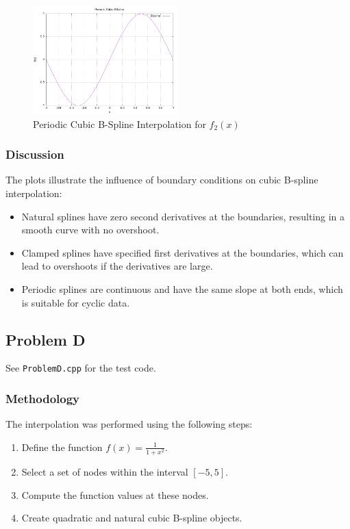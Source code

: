 \documentclass{article}
\begin{document}
\begin{figure}[H]
    \centering
    \includegraphics[width=0.5\textwidth]{../figure/PCBspline_plot.png}
    \caption{Periodic Cubic B-Spline Interpolation for \( f_2(x) \)}
    \label{fig:periodic}
\end{figure}

\subsubsection{Discussion}
The plots illustrate the influence of boundary conditions on cubic B-spline interpolation:
\begin{itemize}
    \item Natural splines have zero second derivatives at the boundaries, resulting in a smooth curve with no overshoot.
    \item Clamped splines have specified first derivatives at the boundaries, which can lead to overshoots if the derivatives are large.
    \item Periodic splines are continuous and have the same slope at both ends, which is suitable for cyclic data.
\end{itemize}


\subsection{Problem D}
See \texttt{ProblemD.cpp} for the test code.
\subsubsection{Methodology}
The interpolation was performed using the following steps:
\begin{enumerate}
    \item Define the function \( f(x) = \frac{1}{1 + x^2} \).
    \item Select a set of nodes within the interval \([-5, 5]\).
    \item Compute the function values at these nodes.
    \item Create quadratic and natural cubic B-spline objects.
\end{enumerate}
\end{document}
